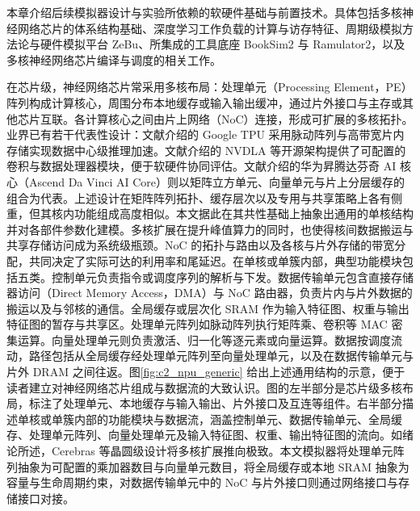 

本章介绍后续模拟器设计与实验所依赖的软硬件基础与前置技术。具体包括多核神经网络芯片的体系结构基础、深度学习工作负载的计算与访存特征、周期级模拟方法论与硬件模拟平台 ZeBu、所集成的工具底座 BookSim2 与 Ramulator2，以及多核神经网络芯片编译与调度的相关工作。



在芯片级，神经网络芯片常采用多核布局：处理单元（Processing Element，PE）阵列构成计算核心，周围分布本地缓存或输入输出缓冲，通过片外接口与主存或其他芯片互联。各计算核心之间由片上网络（NoC）连接，形成可扩展的多核拓扑。业界已有若干代表性设计：文献\parencite{jouppi2017tpu}介绍的 Google TPU 采用脉动阵列与高带宽片内存储实现数据中心级推理加速。文献\parencite{veronesi2021nvdla}介绍的 NVDLA 等开源架构提供了可配置的卷积与数据处理器模块，便于软硬件协同评估。文献\parencite{liao2019davinci,liao2021ascend}介绍的华为昇腾达芬奇 AI 核心（Ascend Da Vinci AI Core）则以矩阵立方单元、向量单元与片上分层缓存的组合为代表。上述设计在矩阵阵列拓扑、缓存层次以及专用与共享策略上各有侧重，但其核内功能组成高度相似。本文据此在其共性基础上抽象出通用的单核结构并对各部件参数化建模。多核扩展在提升峰值算力的同时，也使得核间数据搬运与共享存储访问成为系统级瓶颈。NoC 的拓扑与路由以及各核与片外存储的带宽分配，共同决定了实际可达的利用率和尾延迟。在单核或单簇内部，典型功能模块包括五类。控制单元负责指令或调度序列的解析与下发。数据传输单元包含直接存储器访问（Direct Memory Access，DMA）与 NoC 路由器，负责片内与片外数据的搬运以及与邻核的通信。全局缓存或层次化 SRAM 作为输入特征图、权重与输出特征图的暂存与共享区。处理单元阵列如脉动阵列执行矩阵乘、卷积等 MAC 密集运算。向量处理单元则负责激活、归一化等逐元素或向量运算。数据按调度流动，路径包括从全局缓存经处理单元阵列至向量处理单元，以及在数据传输单元与片外 DRAM 之间往返。图\ref{fig:c2_npu_generic} 给出上述通用结构的示意，便于读者建立对神经网络芯片组成与数据流的大致认识。图的左半部分是芯片级多核布局，标注了处理单元、本地缓存与输入输出、片外接口及互连等组件。右半部分描述单核或单簇内部的功能模块与数据流，涵盖控制单元、数据传输单元、全局缓存、处理单元阵列、向量处理单元及输入特征图、权重、输出特征图的流向。如绪论所述，Cerebras 等晶圆级设计将多核扩展推向极致。本文模拟器将处理单元阵列抽象为可配置的乘加器数目与向量单元数目，将全局缓存或本地 SRAM 抽象为容量与生命周期约束，对数据传输单元中的 NoC 与片外接口则通过网络接口与存储接口对接。

